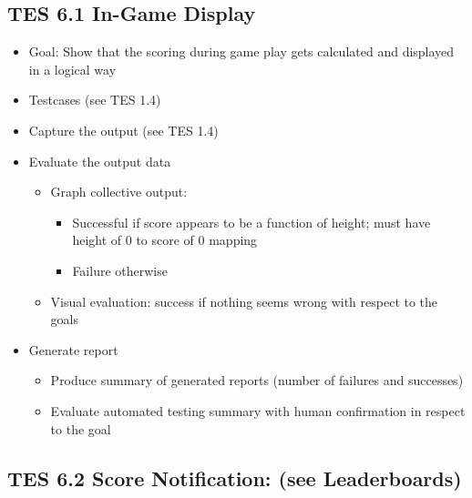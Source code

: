 \subsection{TES 6.1 In-Game Display}
\begin{itemize}
\item Goal: Show that the scoring during game play gets calculated and displayed in a logical way

\item Testcases (see TES 1.4)
\item Capture the output (see TES 1.4)
\item Evaluate the output data
\begin{itemize}
\item Graph collective output:
\begin{itemize}
\item Successful if score appears to be a function of height; must have height of 0 to score of 0 mapping
\item Failure otherwise
\end{itemize}
\item Visual evaluation: success if nothing seems wrong with respect to the goals
\end{itemize}

\item Generate report
\begin{itemize}
\item Produce summary of generated reports (number of failures and successes)
\item Evaluate automated testing summary with human confirmation in respect to the goal
\end{itemize}
\end{itemize}

\subsection{TES 6.2 Score Notification: (see Leaderboards)}

